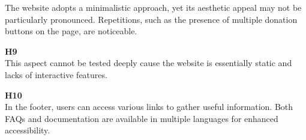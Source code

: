 \begin{description}
    The website adopts a minimalistic approach, yet its aesthetic appeal may not be particularly pronounced. 
    Repetitions, such as the presence of multiple donation buttons on the page, are noticeable.
    \item {\textbf{H9} \color{unicefGray}{Help users recognize, diagnose and recover from errors}}\\
    This aspect cannot be tested deeply cause the website is essentially static and lacks of interactive features.
    \item {\textbf{H10} \color{unicefGray}{Help and documentation}}\\
    In the footer, users can access various links to gather useful information. 
    Both FAQs and documentation are available in multiple languages for enhanced accessibility.
\end{description}
\newpage
